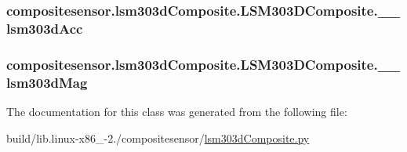 \subsubsection[{\+\_\+\+\_\+lsm303d\+Acc}]{\setlength{\rightskip}{0pt plus 5cm}compositesensor.\+lsm303d\+Composite.\+L\+S\+M303\+D\+Composite.\+\_\+\+\_\+lsm303d\+Acc\hspace{0.3cm}{\ttfamily [private]}}\label{classcompositesensor_1_1lsm303dComposite_1_1LSM303DComposite_a0ebfdf83005bd6facd42c7fd818cc9bc}
\hypertarget{classcompositesensor_1_1lsm303dComposite_1_1LSM303DComposite_a02f21c802c80523cf3726c6ab329ddc8}{}
\subsubsection[{\+\_\+\+\_\+lsm303d\+Mag}]{\setlength{\rightskip}{0pt plus 5cm}compositesensor.\+lsm303d\+Composite.\+L\+S\+M303\+D\+Composite.\+\_\+\+\_\+lsm303d\+Mag\hspace{0.3cm}{\ttfamily [private]}}\label{classcompositesensor_1_1lsm303dComposite_1_1LSM303DComposite_a02f21c802c80523cf3726c6ab329ddc8}


The documentation for this class was generated from the following file\+:\begin{DoxyCompactItemize}
\item 
build/lib.\+linux-\/x86\+\_-\/2./compositesensor/\hyperlink{build_2lib_8linux-x86__64-2_87_2compositesensor_2lsm303dComposite_8py}{lsm303d\+Composite.\+py}\end{DoxyCompactItemize}
